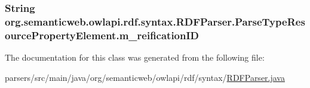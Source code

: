 \hypertarget{classorg_1_1semanticweb_1_1owlapi_1_1rdf_1_1syntax_1_1_r_d_f_parser_1_1_parse_type_resource_property_element_abc1101b2d531728ab4b321005735b94f}{
\subsubsection[{m\-\_\-reification\-I\-D}]{\setlength{\rightskip}{0pt plus 5cm}String org.\-semanticweb.\-owlapi.\-rdf.\-syntax.\-R\-D\-F\-Parser.\-Parse\-Type\-Resource\-Property\-Element.\-m\-\_\-reification\-I\-D\hspace{0.3cm}{\ttfamily [protected]}}}\label{classorg_1_1semanticweb_1_1owlapi_1_1rdf_1_1syntax_1_1_r_d_f_parser_1_1_parse_type_resource_property_element_abc1101b2d531728ab4b321005735b94f}


The documentation for this class was generated from the following file\-:\begin{DoxyCompactItemize}
\item 
parsers/src/main/java/org/semanticweb/owlapi/rdf/syntax/\hyperlink{_r_d_f_parser_8java}{R\-D\-F\-Parser.\-java}\end{DoxyCompactItemize}
